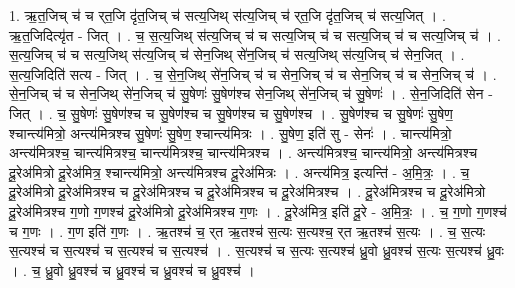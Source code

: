 \documentclass[17pt]{extarticle}
\begin{document}
1. ऋ॒त॒जिच् च॑ च र्‌त॒जि दृ॑त॒जिच् च॑ सत्य॒जिथ् स॑त्य॒जिच् च॑ र्‌त॒जि दृ॑त॒जिच् च॑ सत्य॒जित् । . ऋ॒त॒जिदित्यृ॑त - जित् । . च॒ स॒त्य॒जिथ् स॑त्य॒जिच् च॑ च सत्य॒जिच् च॑ च सत्य॒जिच् च॑ च सत्य॒जिच् च॑ । . स॒त्य॒जिच् च॑ च सत्य॒जिथ् स॑त्य॒जिच् च॑ सेन॒जिथ् से॑न॒जिच् च॑ सत्य॒जिथ् स॑त्य॒जिच् च॑ सेन॒जित् । . स॒त्य॒जिदिति॑ सत्य - जित् । . च॒ से॒न॒जिथ् से॑न॒जिच् च॑ च सेन॒जिच् च॑ च सेन॒जिच् च॑ च सेन॒जिच् च॑ । . से॒न॒जिच् च॑ च सेन॒जिथ् से॑न॒जिच् च॑ सु॒षेणः॑ सु॒षेण॑श्च सेन॒जिथ् से॑न॒जिच् च॑ सु॒षेणः॑ । . से॒न॒जिदिति॑ सेन - जित् । . च॒ सु॒षेणः॑ सु॒षेण॑श्च च सु॒षेण॑श्च च सु॒षेण॑श्च च सु॒षेण॑श्च । . सु॒षेण॑श्च च सु॒षेणः॑ सु॒षेण॒ श्चान्त्य॑मित्रो॒ अन्त्य॑मित्रश्च सु॒षेणः॑ सु॒षेण॒ श्चान्त्य॑मित्रः । . सु॒षेण॒ इति॑ सु - सेनः॑ । . चान्त्य॑मित्रो॒ अन्त्य॑मित्रश्च॒ चान्त्य॑मित्रश्च॒ चान्त्य॑मित्रश्च॒ चान्त्य॑मित्रश्च । . अन्त्य॑मित्रश्च॒ चान्त्य॑मित्रो॒ अन्त्य॑मित्रश्च दू॒रेअ॑मित्रो दू॒रेअ॑मित्र॒ श्चान्त्य॑मित्रो॒ अन्त्य॑मित्रश्च 
दू॒रेअ॑मित्रः । . अन्त्य॑मित्र॒ इत्यन्ति॑ - अ॒मि॒त्रः॒ । . च॒ दू॒रेअ॑मित्रो दू॒रेअ॑मित्रश्च च दू॒रेअ॑मित्रश्च च दू॒रेअ॑मित्रश्च च दू॒रेअ॑मित्रश्च । . दू॒रेअ॑मित्रश्च च दू॒रेअ॑मित्रो दू॒रेअ॑मित्रश्च ग॒णो ग॒णश्च॑ दू॒रेअ॑मित्रो दू॒रेअ॑मित्रश्च ग॒णः । . दू॒रेअ॑मित्र॒ इति॑ दू॒रे - अ॒मि॒त्रः॒ । . च॒ ग॒णो ग॒णश्च॑ च ग॒णः । . ग॒ण इति॑ ग॒णः । . ऋ॒तश्च॑ च॒ र्‌त ऋ॒तश्च॑ स॒त्यः स॒त्यश्च॒ र्‌त ऋ॒तश्च॑ स॒त्यः । . च॒ स॒त्यः स॒त्यश्च॑ च स॒त्यश्च॑ च स॒त्यश्च॑ च स॒त्यश्च॑ । . स॒त्यश्च॑ च स॒त्यः स॒त्यश्च॑ ध्रु॒वो ध्रु॒वश्च॑ स॒त्यः स॒त्यश्च॑ ध्रु॒वः । . च॒ ध्रु॒वो ध्रु॒वश्च॑ च ध्रु॒वश्च॑ च ध्रु॒वश्च॑ च ध्रु॒वश्च॑ । \newline
\end{document}
